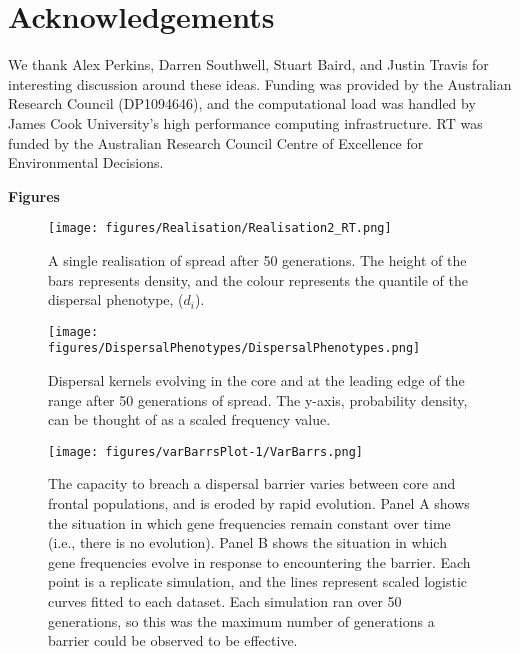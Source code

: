 \documentclass{article}
\begin{document}
\section{Acknowledgements}
We thank Alex Perkins, Darren Southwell, Stuart Baird, and Justin Travis for interesting discussion around these ideas.  Funding was provided by the Australian Research Council (DP1094646), and the computational load was handled by James Cook University's high performance computing infrastructure. RT was funded by the Australian Research Council Centre of Excellence for Environmental Decisions.
    
 

 
 
 \newpage
 \bf{Figures}
 \bigskip
 
 \begin{figure}[h!]
\begin{center}
\texttt{[image: figures/Realisation/Realisation2\_RT.png]}
\caption{\label{fig:realisation}
A single realisation of spread after 50 generations.  The height of the bars represents density, and the colour represents the quantile of the dispersal phenotype, ($d_i$).%
}
\end{center}
\end{figure}

\begin{figure}[h!]
\begin{center}
\texttt{[image: figures/DispersalPhenotypes/DispersalPhenotypes.png]}
\caption{\label{fig:kernels}
Dispersal kernels evolving in the core and at the leading edge
of the range after 50 generations of spread.  The y-axis, probability density, can be thought of as a scaled frequency value.
}
\end{center}
\end{figure}

\begin{figure}[h!]
\begin{center}
\texttt{[image: figures/varBarrsPlot-1/VarBarrs.png]}
\caption{\label{fig:varbars}
The capacity to breach a dispersal barrier varies between core
and frontal populations, and is eroded by rapid evolution. Panel A shows the situation in which gene frequencies remain constant over time (i.e., there is no evolution).  Panel B shows the situation in which gene frequencies evolve in response to encountering the barrier.  Each point is a replicate simulation, and the
lines represent scaled logistic curves fitted to each dataset. Each
simulation ran over 50 generations, so this was the maximum number of
generations a barrier could be observed to be effective.
}
\end{center}
\end{figure}
\end{document}
